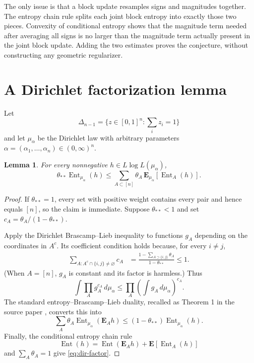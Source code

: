 \documentclass[11pt,a4paper]{article}
\newtheorem{lemma}{Lemma}
\newcommand{\E}{\mathbf E}
\newcommand{\Ent}{\operatorname{Ent}}
\begin{document}
The only issue is that a block update resamples signs and magnitudes together.
The entropy chain rule splits each joint block entropy into exactly those two
pieces.  Convexity of conditional entropy shows that the magnitude term needed
after averaging all signs is no larger than the magnitude term actually
present in the joint block update.  Adding the two estimates proves the
conjecture, without constructing any geometric regularizer.

\section*{A Dirichlet factorization lemma}
Let
\[
 \Delta_{n-1}=\{z\in[0,1]^n:\textstyle\sum_i z_i=1\}
\]
and let $\mu_\alpha$ be the Dirichlet law with arbitrary parameters
$\alpha=(\alpha_1,\ldots,\alpha_n)\in(0,\infty)^n$.

\begin{lemma}\label{lem:dirichlet}
For every nonnegative $h\in L\log L(\mu_\alpha)$,
\begin{equation}\label{eq:dir-factor}
 \theta_{**}\Ent_{\mu_\alpha}(h)
 \le \sum_{A\subset[n]}\theta_A\,
       \E_{\mu_\alpha}[\Ent_A(h)].
\end{equation}
\end{lemma}

\begin{proof}
If $\theta_{**}=1$, every set with positive weight contains every pair and
hence equals $[n]$, so the claim is immediate.  Suppose $\theta_{**}<1$ and
set $c_A=\theta_A/(1-\theta_{**})$.

Apply the Dirichlet Brascamp--Lieb inequality
\cite[Proposition 14]{BCELM} to functions $g_A$ depending on the coordinates
in $A^c$.  Its coefficient condition holds because, for every $i\ne j$,
\begin{align*}
 \sum_{A:A^c\cap\{i,j\}\ne\varnothing}c_A
 &=\frac{1-\sum_{A\supset\{i,j\}}\theta_A}
         {1-\theta_{**}}\le1.
\end{align*}
(When $A=[n]$, $g_A$ is constant and its factor is harmless.)
Thus
\[
 \int\prod_A g_A^{c_A}\,d\mu_\alpha
 \le\prod_A\left(\int g_A\,d\mu_\alpha\right)^{c_A}.
\]
The standard entropy--Brascamp--Lieb duality, recalled as Theorem 1 in the
source paper \cite{CS}, converts this into
\[
 \sum_A\theta_A\Ent_{\mu_\alpha}(\E_Ah)
 \le(1-\theta_{**})\Ent_{\mu_\alpha}(h).
\]
Finally, the conditional entropy chain rule
\[
 \Ent(h)=\Ent(\E_Ah)+\E[\Ent_A(h)]
\]
and $\sum_A\theta_A=1$ give \eqref{eq:dir-factor}.
\end{proof}
\end{document}
